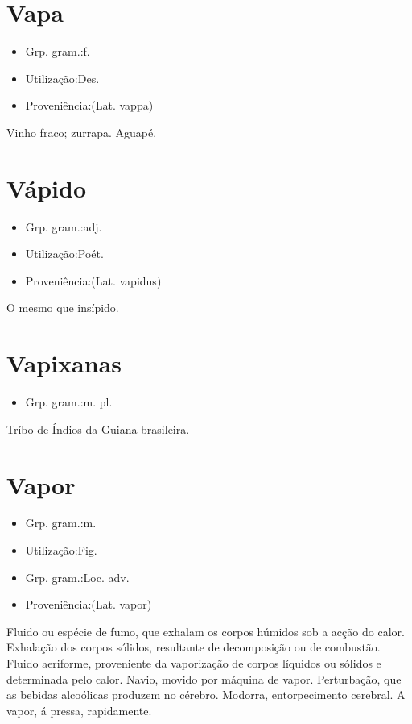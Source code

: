 \documentclass{article}
\begin{document}
\section{Vapa}
\begin{itemize}
\item {Grp. gram.:f.}
\end{itemize}
\begin{itemize}
\item {Utilização:Des.}
\end{itemize}
\begin{itemize}
\item {Proveniência:(Lat. \textunderscore vappa\textunderscore )}
\end{itemize}
Vinho fraco; zurrapa.
Aguapé.
\section{Vápido}
\begin{itemize}
\item {Grp. gram.:adj.}
\end{itemize}
\begin{itemize}
\item {Utilização:Poét.}
\end{itemize}
\begin{itemize}
\item {Proveniência:(Lat. \textunderscore vapidus\textunderscore )}
\end{itemize}
O mesmo que \textunderscore insípido\textunderscore .
\section{Vapixanas}
\begin{itemize}
\item {Grp. gram.:m. pl.}
\end{itemize}
Tríbo de Índios da Guiana brasileira.
\section{Vapor}
\begin{itemize}
\item {Grp. gram.:m.}
\end{itemize}
\begin{itemize}
\item {Utilização:Fig.}
\end{itemize}
\begin{itemize}
\item {Grp. gram.:Loc. adv.}
\end{itemize}
\begin{itemize}
\item {Proveniência:(Lat. \textunderscore vapor\textunderscore )}
\end{itemize}
Fluido ou espécie de fumo, que exhalam os corpos húmidos sob a acção do calor.
Exhalação dos corpos sólidos, resultante de decomposição ou de combustão.
Fluido aeriforme, proveniente da vaporização de corpos líquidos ou sólidos e determinada pelo calor.
Navio, movido por máquina de vapor.
Perturbação, que as bebidas alcoólicas produzem no cérebro.
Modorra, entorpecimento cerebral.
\textunderscore A vapor\textunderscore , á pressa, rapidamente.
\end{document}
